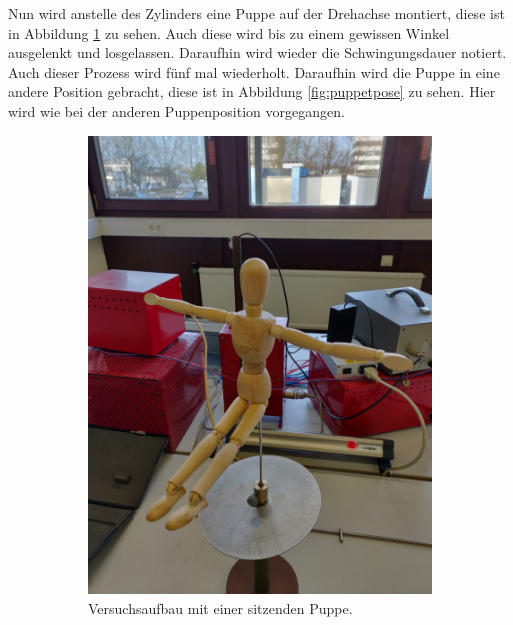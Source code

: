 \FloatBarrier
Nun wird anstelle des Zylinders eine Puppe auf der Drehachse montiert, diese ist in Abbildung \ref{fig:puppesitzend} zu sehen.
Auch diese wird bis zu einem gewissen Winkel ausgelenkt und losgelassen.
Daraufhin wird wieder die Schwingungsdauer notiert.
Auch dieser Prozess wird fünf mal wiederholt.
Daraufhin wird die Puppe in eine andere Position gebracht, diese ist in Abbildung \ref{fig:puppetpose} zu sehen.
Hier wird wie bei der anderen Puppenposition vorgegangen.

\begin{figure}
\centering
\begin{subfigure}{0.5\textwidth}
    \centering
    \includegraphics[scale=0.1]{content/data/PuppeSitzend.png}
    \caption{Versuchsaufbau mit einer sitzenden Puppe.}
    \label{fig:puppesitzend}
\end{subfigure}%
\begin{subfigure}{0.5\textwidth}
    \centering

\end{subfigure}
\end{figure}
